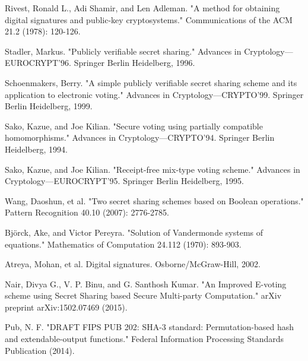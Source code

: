 \documentclass[conference]{IEEEtran}
\begin{document}
\begin{thebibliography}{50}
Rivest, Ronald L., Adi Shamir, and Len Adleman. "A method for obtaining digital signatures and public-key cryptosystems." Communications of the ACM 21.2 (1978): 120-126.

Stadler, Markus. "Publicly verifiable secret sharing." Advances in Cryptology—EUROCRYPT’96. Springer Berlin Heidelberg, 1996.

Schoenmakers, Berry. "A simple publicly verifiable secret sharing scheme and its application to electronic voting." Advances in Cryptology—CRYPTO’99. Springer Berlin Heidelberg, 1999.

Sako, Kazue, and Joe Kilian. "Secure voting using partially compatible homomorphisms." Advances in Cryptology—CRYPTO’94. Springer Berlin Heidelberg, 1994.

Sako, Kazue, and Joe Kilian. "Receipt-free mix-type voting scheme." Advances in Cryptology—EUROCRYPT’95. Springer Berlin Heidelberg, 1995.

Wang, Daoshun, et al. "Two secret sharing schemes based on Boolean operations." Pattern Recognition 40.10 (2007): 2776-2785.

Björck, Ȧke, and Victor Pereyra. "Solution of Vandermonde systems of equations." Mathematics of Computation 24.112 (1970): 893-903.

Atreya, Mohan, et al. Digital signatures. Osborne/McGraw-Hill, 2002.

Nair, Divya G., V. P. Binu, and G. Santhosh Kumar. "An Improved E-voting scheme using Secret Sharing based Secure Multi-party Computation." arXiv preprint arXiv:1502.07469 (2015).

Pub, N. F. "DRAFT FIPS PUB 202: SHA-3 standard: Permutation-based hash and extendable-output functions." Federal Information Processing Standards Publication (2014).

\end{thebibliography}
\end{document}
